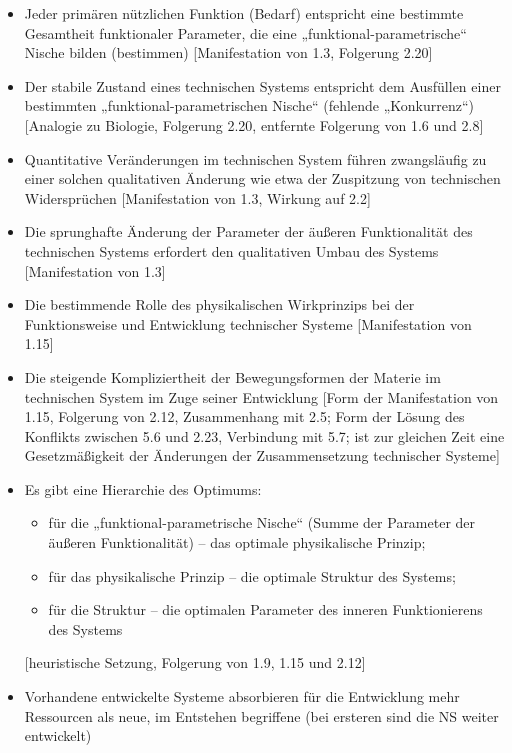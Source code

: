 \documentclass[11pt,a4paper]{article}
\begin{document}
\begin{itemize}
  Unternehmen, Industriezweig usw.) [Folgerung 1.6 und 1.10; je komplizierter
    die natürliche Umgebung, umso gerechter]
\item[2.8.] Jeder primären nützlichen Funktion (Bedarf) entspricht eine
  bestimmte Gesamtheit funktionaler Parameter, die eine
  „funktional-parametrische“ Nische bilden (bestimmen) [Manifestation von 1.3,
    Folgerung 2.20]
\item[2.9.] Der stabile Zustand eines technischen Systems entspricht dem
  Ausfüllen einer bestimmten „funktional-parametrischen Nische“ (fehlende
  „Konkurrenz“) [Analogie zu Biologie, Folgerung 2.20, entfernte Folgerung von
    1.6 und 2.8] 
\item[2.10.] Quantitative Veränderungen im technischen System führen
  zwangsläufig zu einer solchen qualitativen Änderung wie etwa der Zuspitzung
  von technischen Widersprüchen [Manifestation von 1.3, Wirkung auf 2.2]
\item[2.11.] Die sprunghafte Änderung der Parameter der äußeren Funktionalität
  des technischen Systems erfordert den qualitativen Umbau des Systems
  [Manifestation von 1.3]
\item[2.12.] Die bestimmende Rolle des physikalischen Wirkprinzips bei der
  Funktionsweise und Entwicklung technischer Systeme [Manifestation von 1.15]
\item[2.13.] Die steigende Kompliziertheit der Bewegungsformen der Materie im
  technischen System im Zuge seiner Entwicklung [Form der Manifestation von
    1.15, Folgerung von 2.12, Zusammenhang mit 2.5; Form der Lösung des
    Konflikts zwischen 5.6 und 2.23, Verbindung mit 5.7; ist zur gleichen Zeit
    eine Gesetzmäßigkeit der Änderungen der Zusammensetzung technischer
    Systeme]
\item[2.14.] Es gibt eine Hierarchie des Optimums:
  \begin{itemize}\itemsep0pt
  \item für die „funktional-parametrische Nische“ (Summe der Parameter der
    äußeren Funktionalität) -- das optimale physikalische Prinzip; 
  \item für das physikalische Prinzip -- die optimale Struktur des Systems;
  \item für die Struktur -- die optimalen Parameter des inneren Funktionierens
    des Systems
  \end{itemize}
  [heuristische Setzung, Folgerung von 1.9, 1.15 und 2.12]
\item[2.15.] Vorhandene entwickelte Systeme absorbieren für die Entwicklung
  mehr Ressourcen als neue, im Entstehen begriffene (bei ersteren sind die NS
  weiter entwickelt)


\end{itemize}
\end{document}

